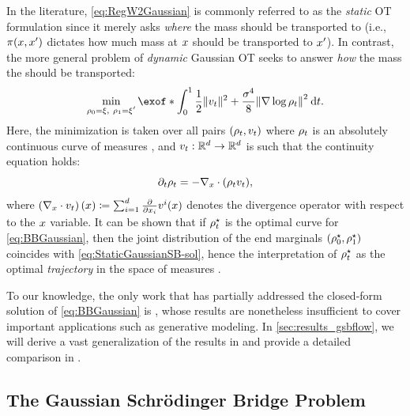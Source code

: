In the literature, \eqref{eq:RegW2Gaussian} is commonly referred to as the \emph{static} \acrshort{OT} formulation since it merely asks \emph{where} the mass should be transported to (i.e., $\pi(x,x')$ dictates how much mass at $x$ should be transported to $x'$). In contrast, the more general problem of \emph{dynamic} Gaussian \acrshort{OT} seeks to answer \emph{how} the mass the should be transported:
\begin{align}
\label{eq:BBGaussian}
\min_{\ssstyle\substack{{\measure[0] = \xi,\ \measure[\horizon] = \xi'}}} \exof*{\int_{0}^\horizon  \frac{1}{2} \norm{\vect}^2 + \frac{\sigma^4}{8} \norm*{\nabla\log\measure}^2 \dt}.
\end{align}Here, the minimization is taken over all pairs $(\rho_{t}, v_t)$ where $\rho_{t}$ is an absolutely continuous curve of measures \citep{ambrosio2006gradient}, and $v_t:\mathbb{R}^d\to\mathbb{R}^d$ is such that the continuity equation holds:
\begin{equation}
\label{eq:Coneq}
\partial_{t}\rho_{t} = - \nabla_{ {x} } \cdot(\rho_{t} v_t),
\end{equation}
where $\left(\nabla_{ {x} } \cdot v_t\right)(x) \coloneqq \sum_{i=1}^d \frac{\partial}{\partial x_i}v^{i}(x)$ denotes the divergence operator with respect to the $x$ variable. It can be shown that if $\rho_{t}^\star$ is the optimal curve for \eqref{eq:BBGaussian}, then the joint distribution of the end marginals $(\rho^\star_0, \rho_1^\star)$ coincides with \eqref{eq:StaticGaussianSB-sol}, hence the interpretation of $\rho_{t}^\star$ as the optimal \emph{trajectory} in the space of measures  \citep{chen2016relation, gentil2017analogy, chen2021stochastic, gentil2020dynamical}.

To our knowledge, the only work that has partially addressed the closed-form solution of \eqref{eq:BBGaussian} is \citet{mallasto2021entropy}, whose results are nonetheless insufficient to cover important applications such as generative modeling. In \cref{sec:results_gsbflow}, we will derive a vast generalization of the results in \citet{mallasto2021entropy} and provide a detailed comparison in .


\subsection{The Gaussian Schr\"odinger Bridge Problem}
\label{sec:overview_gsbflow}


